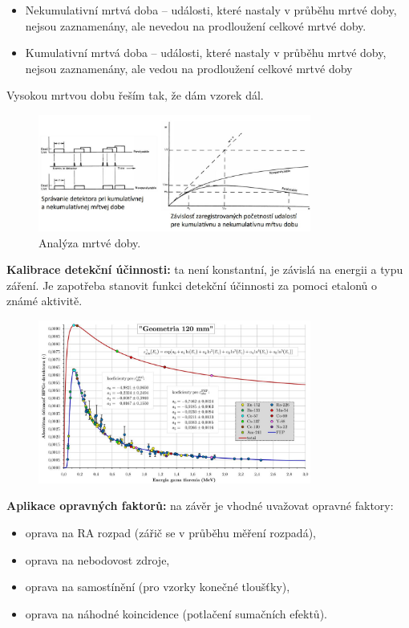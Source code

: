 \begin{itemize}
    \item Nekumulativní mrtvá doba -- události, které nastaly v průběhu mrtvé doby, nejsou zaznamenány, ale nevedou na prodloužení celkové mrtvé doby.
    \item Kumulativní mrtvá doba -- události, které nastaly v průběhu mrtvé doby, nejsou zaznamenány, ale vedou na prodloužení celkové mrtvé doby
\end{itemize}

Vysokou mrtvou dobu řeším tak, že dám vzorek dál.
\begin{figure}[H]
    \centering
    \includegraphics[width=0.8\textwidth]{img/mrtva_doba.JPG}
    \caption{Analýza mrtvé doby.}
\end{figure}

\textbf{Kalibrace detekční účinnosti:} ta není konstantní, je závislá na energii a typu záření. Je zapotřeba stanovit funkci detekční účinnosti za pomoci etalonů o známé aktivitě.

\begin{figure}[H]
    \centering
    \includegraphics[width=0.8\textwidth]{img/detekcni_krivka.JPG}
\end{figure}

\textbf{Aplikace opravných faktorů:} na závěr je vhodné uvažovat opravné faktory:

\begin{itemize}
    \item oprava na RA rozpad (zářič se v průběhu měření rozpadá),
    \item oprava na nebodovost zdroje,
    \item oprava na samostínění (pro vzorky konečné tloušťky),
    \item oprava na náhodné koincidence (potlačení sumačních efektů).
\end{itemize}


